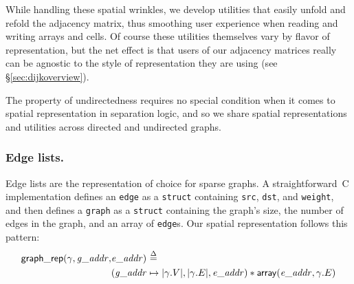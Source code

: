 While handling these spatial wrinkles, we develop utilities that easily 
unfold and refold the adjacency matrix, thus smoothing user 
experience when reading and writing arrays and cells. Of course
these utilities themselves vary by flavor of representation, but 
the net effect is that users of our adjacency matrices really can 
be agnostic to the style of representation they are using 
(see \S\ref{sec:dijkoverview}).

The property of undirectedness requires no special condition 
when it comes to spatial representation in separation logic, 
and so we share spatial representations and utilities 
across directed and undirected graphs.


\subsubsection{Edge lists.}

Edge lists are the representation of choice 
for sparse graphs. A straightforward~C implementation 
defines an \texttt{edge} as a 
\texttt{struct} containing \texttt{src}, \texttt{dst}, and 
\texttt{weight}, and then defines a \texttt{graph} as a 
\texttt{struct} containing 
the graph's size, the number of edges in the graph, 
and an array of \texttt{edge}s. Our spatial representation 
follows this pattern:
\vspace{-0.5em}
\begin{equation*}
\begin{split}
\mathsf{graph\_rep}(\gamma, \mathit{g\_addr}, &\mathit{e\_addr})~\mathbin{\stackrel{\Delta}{=}}~ \\
&(\mathit{g\_addr} \mapsto \lvert\gamma.V\rvert, \lvert\gamma.E\rvert, \mathit{e\_addr})
\ast
\mathsf{array}(\mathit{e\_addr},\gamma.E)
\end{split}
\end{equation*}


